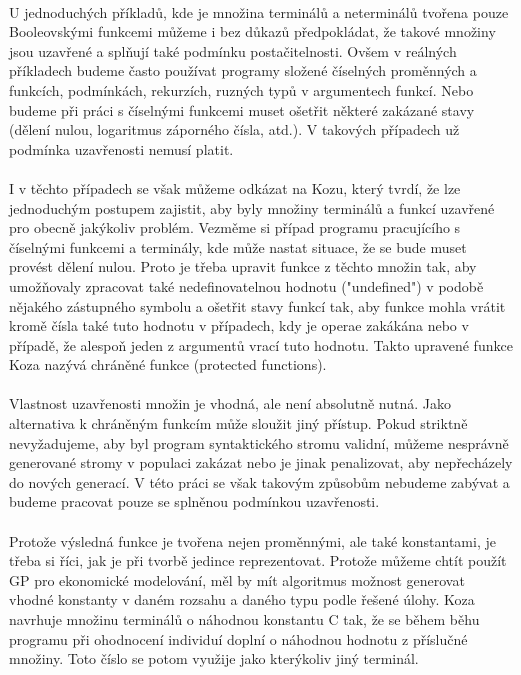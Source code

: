 \documentclass[bc,male,java,dept460]{diploma}		%
\begin{document}
\paragraph*{}
U jednoduchých příkladů, kde je množina terminálů a neterminálů tvořena pouze Booleovskými funkcemi můžeme i bez důkazů předpokládat, že takové množiny jsou uzavřené a splňují také podmínku postačitelnosti. Ovšem v reálných příkladech budeme často používat programy složené číselných proměnných a funkcích, podmínkách, rekurzích, ruzných typů v argumentech funkcí. Nebo budeme při práci s číselnými funkcemi muset ošetřit některé zakázané stavy (dělení nulou, logaritmus záporného čísla, atd.). V takových případech už podmínka uzavřenosti nemusí platit.
\paragraph*{}
I v těchto případech se však můžeme odkázat na Kozu, který tvrdí, že lze jednoduchým postupem zajistit, aby byly množiny terminálů a funkcí uzavřené pro obecně jakýkoliv problém. Vezměme si případ programu pracujícího s číselnými funkcemi a terminály, kde může nastat situace, že se bude muset provést dělení nulou. Proto je třeba upravit funkce z těchto množin tak, aby umožňovaly zpracovat také nedefinovatelnou hodnotu ("undefined") v podobě nějakého zástupného symbolu a ošetřit stavy funkcí tak, aby funkce mohla vrátit kromě čísla také tuto hodnotu v případech, kdy je operae zakákána nebo v případě, že alespoň jeden z argumentů vrací tuto hodnotu. Takto upravené funkce Koza nazývá chráněné funkce (protected functions).
\paragraph*{}
Vlastnost uzavřenosti množin je vhodná, ale není absolutně nutná. Jako alternativa k chráněným funkcím může sloužit jiný přístup. Pokud striktně nevyžadujeme, aby byl program syntaktického stromu validní, můžeme nesprávně generované stromy v populaci zakázat nebo je jinak penalizovat, aby nepřecházely do nových generací. V této práci se však takovým způsobům nebudeme zabývat a budeme pracovat pouze se splněnou podmínkou uzavřenosti.
\paragraph*{}
Protože výsledná funkce je tvořena nejen proměnnými, ale také konstantami, je třeba si říci, jak je při tvorbě jedince reprezentovat. Protože můžeme chtít použít GP pro ekonomické modelování, měl by mít algoritmus možnost generovat vhodné konstanty v daném rozsahu a daného typu podle řešené úlohy. Koza navrhuje množinu terminálů o náhodnou konstantu C tak, že se během běhu programu při ohodnocení individuí doplní o náhodnou hodnotu z příslučné množiny. Toto číslo se potom využije jako kterýkoliv jiný terminál.
\end{document}
